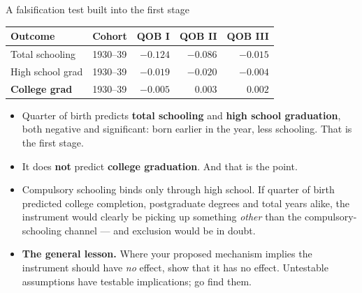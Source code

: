 \documentclass[
  11pt,
  ignorenonframetext,
  aspectratio=169,
]{beamer}
\providecommand{\tightlist}{%
  \setlength{\itemsep}{0pt}\setlength{\parskip}{0pt}}
\begin{document}
\begin{frame}{A falsification test built into the first stage}
\protect{}\label{a-falsification-test-built-into-the-first-stage}
\begin{center}
\small
\begin{tabular}{llrrr}
\toprule
Outcome & Cohort & QOB I & QOB II & QOB III \\
\midrule
Total schooling  & 1930--39 & $-0.124$ & $-0.086$ & $-0.015$ \\
High school grad & 1930--39 & $-0.019$ & $-0.020$ & $-0.004$ \\
\textbf{College grad} & 1930--39 & $-0.005$ & $\phantom{-}0.003$ & $\phantom{-}0.002$ \\
\bottomrule
\end{tabular}
\end{center}

\begin{itemize}
\tightlist
\item
  Quarter of birth predicts \textbf{total schooling} and \textbf{high
  school graduation}, both negative and significant: born earlier in the
  year, less schooling. That is the first stage.
\item
  It does \textbf{not} predict \textbf{college graduation}. And that is
  the point.
\item
  Compulsory schooling binds only through high school. If quarter of
  birth predicted college completion, postgraduate degrees and total
  years alike, the instrument would clearly be picking up something
  \emph{other} than the compulsory-schooling channel --- and exclusion
  would be in doubt.
\item
  \textbf{The general lesson.} Where your proposed mechanism implies the
  instrument should have \emph{no} effect, show that it has no effect.
  Untestable assumptions have testable implications; go find them.
\end{itemize}
\end{frame}
\end{document}
